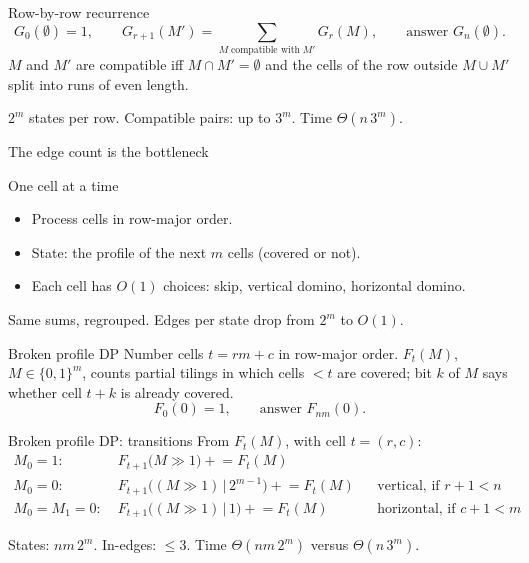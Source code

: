 \begin{frame}{Row-by-row recurrence}
	\[
		G_0(\emptyset)=1,\qquad
		G_{r+1}(M')=\sum_{M\;\text{compatible with}\;M'}G_r(M),\qquad\text{answer }G_n(\emptyset).
	\]
	$M$ and $M'$ are compatible iff $M\cap M'=\emptyset$ and the cells of the row outside $M\cup M'$ split into
	runs of even length.

	\seprule

	$2^m$ states per row. Compatible pairs: up to $3^m$. Time $\Theta(n\,3^m)$.
\end{frame}

\begin{frame}{The edge count is the bottleneck}
\end{frame}

\begin{frame}{One cell at a time}
	\begin{itemize}
		\item Process cells in row-major order.
		\item State: the \alert{profile} of the next $m$ cells (covered or not).
		\item Each cell has $O(1)$ choices: skip, vertical domino, horizontal domino.
	\end{itemize}

	\seprule

	Same sums, regrouped. Edges per state drop from $2^m$ to $O(1)$.
\end{frame}

\begin{frame}{Broken profile DP}
	Number cells $t=rm+c$ in row-major order. $F_t(M)$, $M\in\{0,1\}^m$, counts partial tilings in which cells $<t$ are
	covered; bit $k$ of $M$ says whether cell $t+k$ is already covered.
	\[
		F_0(0)=1,\qquad \text{answer }F_{nm}(0).
	\]
\end{frame}

\begin{frame}{Broken profile DP: transitions}
	From $F_t(M)$, with cell $t=(r,c)$:
	\begin{align*}
		M_0=1:\;& F_{t+1}\bigl(M\gg1\bigr)\mathrel{+}=F_t(M)\\
		M_0=0:\;& F_{t+1}\bigl((M\gg1)\,|\,2^{m-1}\bigr)\mathrel{+}=F_t(M) && \text{vertical, if } r+1<n\\
		M_0=M_1=0:\;& F_{t+1}\bigl((M\gg1)\,|\,1\bigr)\mathrel{+}=F_t(M) && \text{horizontal, if } c+1<m
	\end{align*}

	\seprule

	States: $nm\,2^m$. In-edges: $\le 3$. Time $\Theta(nm\,2^m)$ versus $\Theta(n\,3^m)$.
\end{frame}

